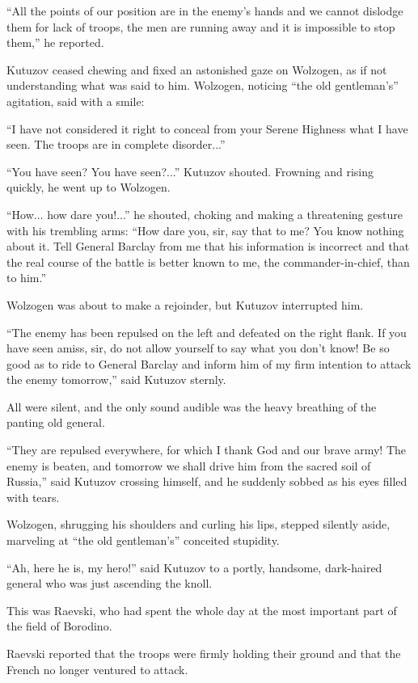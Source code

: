 ``All the points of our position are in the enemy's hands and we
cannot dislodge them for lack of troops, the men are running away
and it is impossible to stop them,'' he reported.

Kutuzov ceased chewing and fixed an astonished gaze on Wolzogen,
as if not understanding what was said to him. Wolzogen, noticing
``the old gentleman's'' agitation, said with a smile:

``I have not considered it right to conceal from your Serene
Highness what I have seen. The troops are in complete
disorder...''

``You have seen? You have seen?...'' Kutuzov shouted. Frowning
and rising quickly, he went up to Wolzogen.

``How... how dare you!...'' he shouted, choking and making a
threatening gesture with his trembling arms: ``How dare you, sir,
say that to me? You know nothing about it. Tell General Barclay
from me that his information is incorrect and that the real
course of the battle is better known to me, the
commander-in-chief, than to him.''

Wolzogen was about to make a rejoinder, but Kutuzov interrupted
him.

``The enemy has been repulsed on the left and defeated on the
right flank. If you have seen amiss, sir, do not allow yourself
to say what you don't know! Be so good as to ride to General
Barclay and inform him of my firm intention to attack the enemy
tomorrow,'' said Kutuzov sternly.

All were silent, and the only sound audible was the heavy
breathing of the panting old general.

``They are repulsed everywhere, for which I thank God and our
brave army!  The enemy is beaten, and tomorrow we shall drive him
from the sacred soil of Russia,'' said Kutuzov crossing himself,
and he suddenly sobbed as his eyes filled with tears.

Wolzogen, shrugging his shoulders and curling his lips, stepped
silently aside, marveling at ``the old gentleman's'' conceited
stupidity.

``Ah, here he is, my hero!'' said Kutuzov to a portly, handsome,
dark-haired general who was just ascending the knoll.

This was Raevski, who had spent the whole day at the most
important part of the field of Borodino.

Raevski reported that the troops were firmly holding their ground
and that the French no longer ventured to attack.

